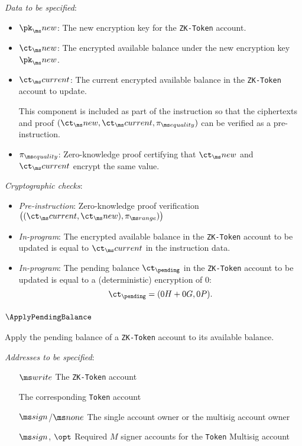 \noindent
\textit{Data to be specified}:
\begin{itemize}
  \item $\pk_\new$: The new encryption key for the \texttt{ZK-Token} account.
    
  \item $\ct_\new$: The encrypted available balance under the new encryption
    key~$\pk_\new$.

  \item $\ct_\current$: The current encrypted available balance in the
    \texttt{ZK-Token} account to update.

    This component is included as part of the instruction so that the
    ciphertexts and proof $(\ct_\new, \ct_\current, \piequality)$ can be
    verified as a pre-instruction.

  \item $\piequality$: Zero-knowledge proof certifying that $\ct_\new$ and
    $\ct_\current$ encrypt the same value.

\end{itemize}


\noindent
\textit{Cryptographic checks}:
\begin{itemize}
  \item \textit{Pre-instruction}: Zero-knowledge proof verification
    $\big((\ct_\current, \ct_\new), \pirange)\big)$
  \item \textit{In-program}: The encrypted available balance in the
    \texttt{ZK-Token} account to be updated is equal to $\ct_\current$ in the
    instruction data.
  \item \textit{In-program}: The pending balance $\ct_\pending$ in the
    \texttt{ZK-Token} account to be updated is equal to a (deterministic)
    encryption of 0:
    \[ \ct_\pending = (0H + 0G, 0P) .\]
  \end{itemize}

\newpage
\subsubsection{$\ApplyPendingBalance$}
Apply the pending balance of a \texttt{ZK-Token} account to its available
balance.
\vspace{0.5em}

\noindent
\textit{Addresses to be specified}:
\begin{itemize}[leftmargin=2.5cm]
  \item[$\writable$] The \texttt{ZK-Token} account
  \item[] The corresponding \texttt{Token} account
  \item[$\signer$/$\none$] The single account owner or the multisig account owner
  \item[$\signer$, $\opt$] Required $M$ signer accounts for the \texttt{Token}
    Multisig account
\end{itemize}


